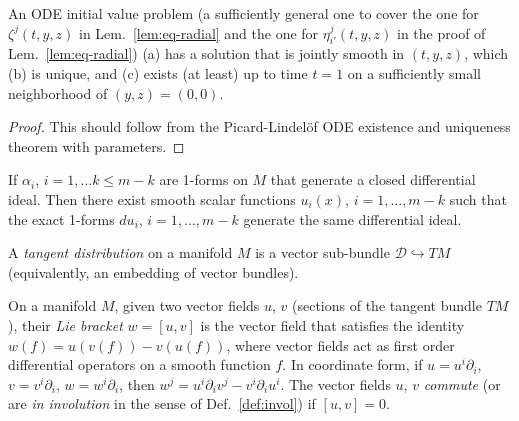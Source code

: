 \begin{lemma} \label{lem:eq-radial-exists}
An ODE initial value problem (a sufficiently general one to cover the one for
$\zeta^j(t,y,z)$ in Lem.~\ref{lem:eq-radial} and the one for
$\eta_{i'}^j(t,y,z)$ in the proof of Lem.~\ref{lem:eq-radial}) (a) has a
solution that is jointly smooth in $(t,y,z)$, which (b) is unique, and (c)
exists (at least) up to time $t=1$ on a sufficiently small neighborhood of
$(y,z) = (0,0)$.
\end{lemma}
\begin{proof}
This should follow from the Picard-Lindel\"of ODE existence and uniqueness
theorem with parameters.
\end{proof}

\begin{definition} \label{def:forms}
\notready
\end{definition}

\begin{definition} \label{def:diff-ideal}
\notready
\end{definition}

\begin{theorem} \label{thm:frob-forms}
If $\alpha_i$, $i=1,\ldots k\le m-k$ are 1-forms on $M$ that generate a closed
differential ideal. Then there exist smooth scalar functions $u_i(x)$,
$i=1,\ldots,m-k$ such that the exact 1-forms $du_i$, $i=1,\ldots,m-k$ generate
the same differential ideal.
\end{theorem}

\begin{definition} \label{def:vec-dist}
A \emph{tangent distribution} on a manifold $M$ is a vector sub-bundle
$\mathcal{D}\hookrightarrow TM$ (equivalently, an embedding of vector bundles).
\end{definition}

\begin{definition} \label{def:lie}
On a manifold $M$, given two vector fields $u$, $v$ (sections of the tangent
bundle $TM$), their \emph{Lie bracket} $w = [u,v]$ is the vector field that
satisfies the identity $w(f) = u(v(f)) - v(u(f))$, where vector fields act as
first order differential operators on a smooth function $f$. In coordinate form,
if $u = u^i\partial_i$, $v = v^i\partial_i$, $w = w^i\partial_i$, then $w^j =
u^i \partial_i v^j - v^i \partial_i u^i$. The vector fields $u$, $v$
\emph{commute} (or are \emph{in involution} in the sense of
Def.~\ref{def:invol}) if $[u,v] = 0$.
\end{definition}

